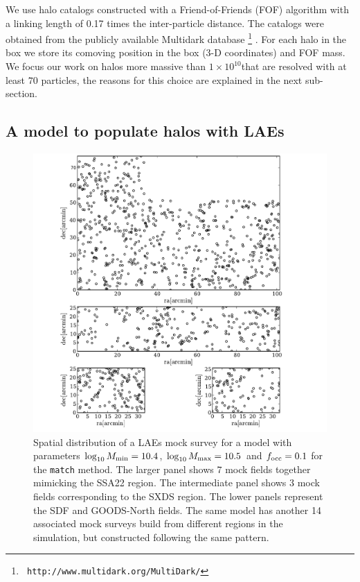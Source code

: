 \documentclass[usenatbib]{mn2e}
\newcommand{\hMsun}{{\ifmmode{h^{-1}{\rm
        {M_{\odot}}}}\else{$h^{-1}{\rm{M_{\odot}}}$}\fi}}
\begin{document}
We use halo catalogs constructed with a Friend-of-Friends (FOF)
algorithm with a linking length of 0.17 times the inter-particle
distance. The catalogs were obtained from the publicly available
Multidark database \footnote{{\tt
    http://www.multidark.org/MultiDark/}}
\citep{MultiDark}. For each halo in the box we store its
comoving position in the box (3-D coordinates) and FOF mass. We focus our work
on halos more massive than $1\times 10^{10}$\hMsun that are resolved
with at least $70$ particles, the reasons for this choice are
explained in the next sub-section.  


\subsection{A model to populate halos with LAEs}
\label{subsec:mocks}



\begin{figure}
\begin{center}
\includegraphics[width=0.8\linewidth,angle=0]{Figure0.pdf}
\caption{ \label{fig:distros} Spatial distribution of a LAEs mock
  survey for a model with parameters $\log_{10}M_{\rm min}=10.4$, $\log_{10}M_{\rm
    max}=10.5$ and $f_{\rm occ}=0.1$ for the {\texttt{match}}
  method. The larger panel shows $7$ mock
  fields together mimicking the SSA22 region. The intermediate panel
  shows $3$ mock fields corresponding to the SXDS region. The lower
  panels represent the SDF and GOODS-North fields. The same model has
  another 14 associated mock surveys build from different regions in
  the simulation, but constructed following the same pattern.}
\end{center} 
\end{figure}
\end{document}
